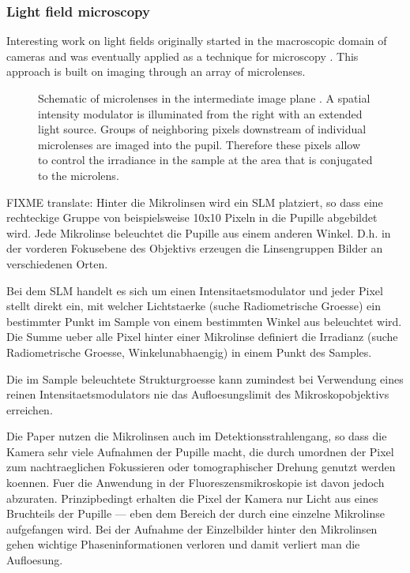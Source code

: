 \subsubsection{Light field microscopy}
\label{sec:light-field-microscopy}
Interesting work on light fields originally started in the macroscopic
domain of cameras \citep{Lippmann1908 %
} and was eventually
applied as a technique for microscopy
\citep{Levoy2006,Levoy2009,Zhang2009}. This approach is built on
imaging through an array of microlenses.
\begin{figure}[!hbt]
  \centering
  \caption{Schematic of microlenses in the intermediate image plane
    \citep[inspired from][]{Levoy2006}. A spatial intensity modulator
    is illuminated from the right with an extended light
    source. Groups of neighboring pixels downstream of individual
    microlenses are imaged into the pupil. Therefore these pixels
    allow to control the irradiance in the sample at the area that is
    conjugated to the microlens. }
  \label{fig:microlens-levoy-sketch}
\end{figure}

FIXME translate: Hinter die Mikrolinsen wird ein SLM platziert, so
dass eine rechteckige Gruppe von beispielsweise 10x10 Pixeln in die
Pupille abgebildet wird. Jede Mikrolinse beleuchtet die Pupille aus
einem anderen Winkel. D.h. in der vorderen Fokusebene des Objektivs
erzeugen die Linsengruppen Bilder an verschiedenen Orten.

Bei dem SLM handelt es sich um einen Intensitaetsmodulator und jeder
Pixel stellt direkt ein, mit welcher Lichtstaerke (suche
Radiometrische Groesse) ein bestimmter Punkt im Sample von einem
bestimmten Winkel aus beleuchtet wird.  Die Summe ueber alle Pixel
hinter einer Mikrolinse definiert die Irradianz (suche Radiometrische
Groesse, Winkelunabhaengig) in einem Punkt des Samples.

Die im Sample beleuchtete Strukturgroesse kann zumindest bei
Verwendung eines reinen Intensitaetsmodulators nie das
Aufloesungslimit des Mikroskopobjektivs erreichen.


Die Paper nutzen die Mikrolinsen auch im Detektionsstrahlengang, so
dass die Kamera sehr viele Aufnahmen der Pupille macht, die durch
umordnen der Pixel zum nachtraeglichen Fokussieren oder
tomographischer Drehung genutzt werden koennen.  Fuer die Anwendung in
der Fluoreszensmikroskopie ist davon jedoch abzuraten. Prinzipbedingt
erhalten die Pixel der Kamera nur Licht aus eines Bruchteils der
Pupille --- eben dem Bereich der durch eine einzelne Mikrolinse
aufgefangen wird. Bei der Aufnahme der Einzelbilder hinter den
Mikrolinsen gehen wichtige Phaseninformationen verloren und damit
verliert man die Aufloesung.

